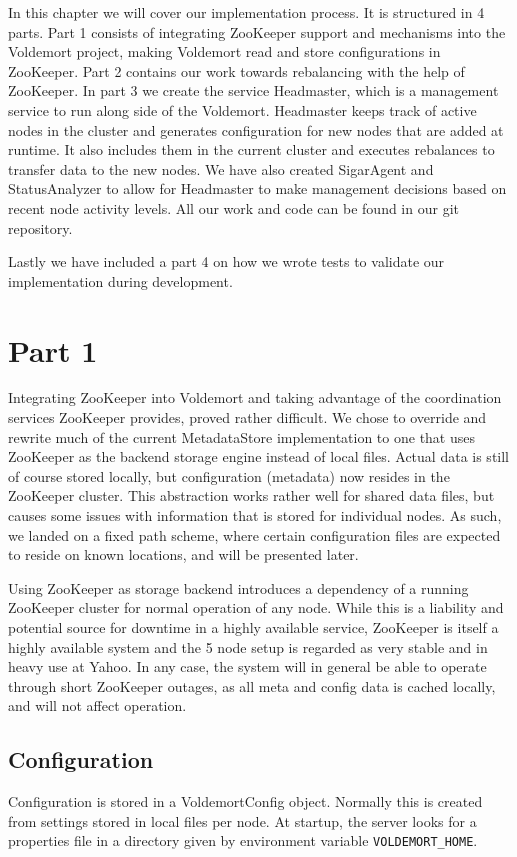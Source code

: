 
In this chapter we will cover our implementation process. It is structured in 4 parts. Part 1 consists of integrating ZooKeeper support and mechanisms into the Voldemort project, making Voldemort read and store configurations in ZooKeeper. Part 2 contains our work towards rebalancing with the help of ZooKeeper. In part 3 we create the service Headmaster, which is a management service to run along side of the Voldemort. Headmaster keeps track of active nodes in the cluster and generates configuration for new nodes that are added at runtime. It also includes them in the current cluster and executes rebalances to transfer data to the new nodes. We have also created SigarAgent and StatusAnalyzer to allow for Headmaster to make management decisions based on recent node activity levels. All our work and code can be found in our git repository\cite{githubvold}.

Lastly we have included a part 4 on how we wrote tests to validate our implementation during development.

\section{Part 1}
Integrating ZooKeeper into Voldemort and taking advantage of the coordination services ZooKeeper provides, proved rather difficult.
We chose to override and rewrite much of the current MetadataStore implementation to one that uses ZooKeeper as the backend storage engine instead of local files. 
Actual data is still of course stored locally, but configuration (metadata) now resides in the ZooKeeper cluster.
This abstraction works rather well for shared data files, but causes some issues with information that is stored for individual nodes. 
As such, we landed on a fixed path scheme, where certain configuration files are expected to reside on known locations, and will be presented later.

Using ZooKeeper as storage backend introduces a dependency of a running ZooKeeper cluster for normal operation of any node. While this is a liability and potential source for downtime in a highly available service, ZooKeeper is itself a highly available system and the 5 node setup is regarded as very stable and in heavy use at Yahoo\cite{zookeeperpaper}. In any case, the system will in general be able to operate through short ZooKeeper outages, as all meta and config data is cached locally, and will not affect operation. 

\subsection{Configuration}
Configuration is stored in a VoldemortConfig object. Normally this is created from settings stored in local files per node. At startup, the server looks for a properties file in a directory given by environment variable \texttt{VOLDEMORT\_HOME}. 

